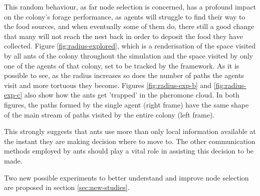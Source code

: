 This random behaviour, as far node selection is concerned, has a profound impact on the colony's forage performance, as agents will struggle to find their way to the food sources, and when eventually some of them do, there still a good change that many will not reach the nest back in order to deposit the food they have collected.  Figure \ref{fig:radius-explored}, which is a renderisation  of the space visited by all ants of the colony throughout the simulation and the space visited by only one of the agents of that colony, set to be tracked by the framework. As it is possible to see, as the radius increases so does the number of paths the agents visit and more tortuous they become. Figures \ref{fig:radius-exp-b} and \ref{fig:radius-exp-c} also show how the ants get 'trapped' in the pheromone cloud. In both figures, the paths formed by the single agent (right frame) have the same shape of the main stream of paths visited by the entire colony (left frame). 

This strongly suggests that ants use more than only local information available at the instant they are making decision where to move to. The other communication methods employed by ants should play a vital role in assisting this decision to be made.

Two new possible experiments to better understand and improve node selection are proposed in section \ref{sec:new-studies}.

